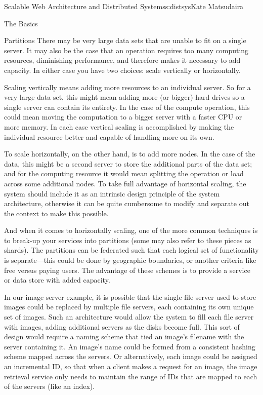 \begin{aosachapter}{Scalable Web Architecture and Distributed Systems}{s:distsys}{Kate Matsudaira}
\begin{aosasect1}{The Basics}
\begin{aosasect2}{Partitions}
There may be very large data sets that are unable to fit on a single
server. It may also be the case that an operation requires too many
computing resources, diminishing performance, and therefore makes it
necessary to add capacity. In either case you have two choices: scale
vertically or horizontally.

Scaling vertically means adding more resources to an individual
server. So for a very large data set, this might mean adding more (or
bigger) hard drives so a single server can contain its entirety. In
the case of the compute operation, this could mean moving the
computation to a bigger server with a faster CPU or more memory. In
each case vertical scaling is accomplished by making the individual
resource better and capable of handling more on its own.

To scale horizontally, on the other hand, is to add more nodes. In the
case of the data, this might be a second server to store the
additional parts of the data set; and for the computing resource it
would mean splitting the operation or load across some additional
nodes. To take full advantage of horizontal scaling, the system should
include it as an intrinsic design principle of the system
architecture, otherwise it can be quite cumbersome to modify and
separate out the context to make this possible.

And when it comes to horizontally scaling, one of the more common
techniques is to break-up your services into partitions (some may also
refer to these pieces as shards). The partitions can be federated such
that each logical set of functionality is separate---this could be
done by geographic boundaries, or another criteria like free versus
paying users. The advantage of these schemes is to provide a service
or data store with added capacity.

In our image server example, it is possible that the single file
server used to store images could be replaced by multiple file
servers, each containing its own unique set of images. Such an
architecture would allow the system to fill each file server with
images, adding additional servers as the disks become full. This sort
of design would require a naming scheme that tied an image’s filename
with the server containing it. An image’s name could be formed from a
consistent hashing scheme mapped across the servers. Or alternatively,
each image could be assigned an incremental ID, so that when a client
makes a request for an image, the image retrieval service only needs
to maintain the range of IDs that are mapped to each of the servers
(like an index).


\end{aosasect2}
\end{aosasect1}
\end{aosachapter}
